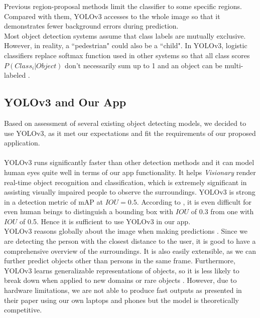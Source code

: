 \documentclass[letterpaper]{article} %
\begin{document}
\noindent Previous region-proposal methods limit the classifier to some specific regions. Compared with them, YOLOv3 accesses to the whole image so that it demonstrates fewer background errors during prediction.\\

\noindent Most object detection systems assume that class labels are mutually exclusive. However, in reality, a ``pedestrian" could also be a ``child". In YOLOv3, logistic classifiers replace softmax function used in other systems so that all class scores $P(Class_{i}|Object)$ don't necessarily sum up to 1 and an object can be multi-labeled \cite{YOLOdev}.

\subsection{YOLOv3 and Our App}
Based on assessment of several existing object detecting models, we decided to use YOLOv3, as it met our expectations and fit the requirements of our proposed application.\\
\\
\noindent YOLOv3 runs significantly faster than other detection methods and it can model human eyes quite well in terms of our app functionality. It helps \textit{Visionary} render real-time object recognition and classification, which is extremely significant in assisting visually impaired people to observe the surroundings. YOLOv3 is strong in a detection metric of mAP at $IOU=0.5$. According to \cite{Human-machine}, it is even difficult for even human beings to distinguish a bounding box with $IOU$ of 0.3 from one with $IOU$ of 0.5. Hence it is sufficient to use YOLOv3 in our app.\\

\noindent YOLOv3 reasons globally about the image when making predictions \cite{YOLOv3}. Since we are detecting the person with the closest distance to the user, it is good to have a comprehensive overview of the surroundings. It is also easily extensible, as we can further predict objects other than persons in the same frame. Furthermore, YOLOv3 learns generalizable representations of objects, so it is less likely to break down when applied to new domains or rare objects \cite{YOLOv3}. However, due to hardware limitations, we are not able to produce fast outputs as presented in their paper using our own laptops and phones but the model is theoretically competitive.
\end{document}
